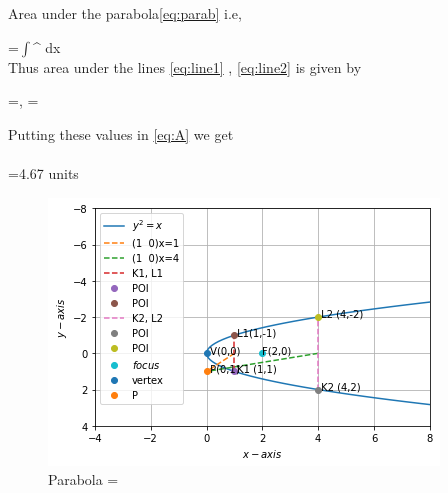 \documentclass[journal,12pt,twocolumn]{IEEEtran}
\begin{document}
Area under the parabola\eqref{eq:parab} i.e,

 =$\int$^ dx \\

Thus area under the lines \eqref{eq:line1} , \eqref{eq:line2} is given by

 =,
=  



Putting these values in \eqref{eq:A} we get\\
\implies{}\\
 =4.67 units


\begin{figure}[!ht]
\centering
\includegraphics[width=\columnwidth]{download.png}
\caption{Parabola  =  }
\label{fig:parab_tangent}	
\end{figure}
\end{document}
